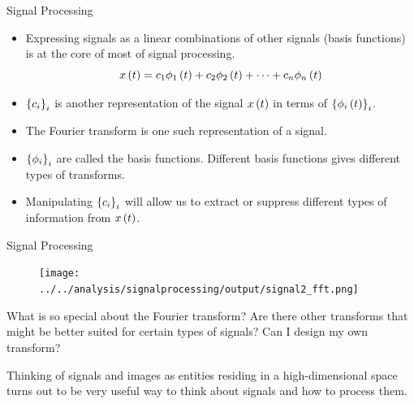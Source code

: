 \documentclass[aspectratio=169]{beamer}
\let\olditem\item
\renewcommand{\item}{\setlength{\itemsep}{\fill}\olditem}
\def\lp{\ensuremath\left(}
\def\rp{\ensuremath\right)}
\def\lc{\ensuremath\left\{}
\def\rc{\ensuremath\right\}}
\newcommand{\ct}[1]{\lp #1\rp}
\begin{document}
\begin{frame}{Signal Processing}
  \begin{itemize}
    \item Expressing signals as a linear combinations of other signals (basis functions) is at the core of most of signal processing.
    \[ x\ct{t} = c_1 \phi_1\ct{t} + c_2 \phi_2\ct{t} + \cdots + c_n \phi_n\ct{t} \]

    \item $\lc c_i \rc_{i}$ is another representation of the signal $x\ct{t}$ in terms of $\lc \phi_i\ct{t} \rc_i$.
    
    \item The Fourier transform is one such representation of a signal.
    
    \item $\lc \phi_i \rc_{i}$ are called the basis functions. Different basis functions gives different types of transforms.
    
    \item Manipulating $\lc c_i \rc_i$ will allow us to extract or suppress different types of information from $x\ct{t}$.
  \end{itemize}
\end{frame}




\begin{frame}{Signal Processing}
  \begin{figure}
    \centering
    \texttt{[image: ../../analysis/signalprocessing/output/signal2\_fft.png]}
  \end{figure}

  What is so special about the Fourier transform? Are there other transforms that might be better suited for certain types of signals? Can I design my own transform?
  \vspace{0.2cm}

  Thinking of signals and images as entities residing in a high-dimensional space turns out to be very useful way to think about signals and how to process them.
\end{frame}
\end{document}
